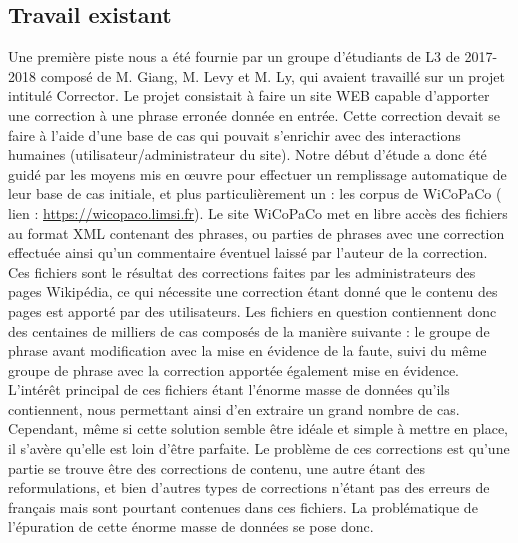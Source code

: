 \documentclass{article}
\begin{document}
\subsection{Travail existant}

Une premi\`{e}re piste nous a \'{e}t\'{e} fournie par un groupe d'\'{e}tudiants de L3 de 2017-2018 compos\'{e} de M. Giang, M. Levy et M. Ly, qui avaient travaill\'{e} sur un projet intitul\'{e} Corrector. Le projet consistait \`{a} faire un site WEB capable d'apporter une correction \`{a} une phrase erron\'{e}e donn\'{e}e en entr\'{e}e. Cette correction devait se faire \`{a} l'aide d'une base de cas qui pouvait s'enrichir avec des interactions humaines (utilisateur/administrateur du site). 
\newline
\newline
Notre d\'{e}but d'\'{e}tude a donc \'{e}t\'{e} guid\'{e} par les moyens mis en {\oe}uvre pour effectuer un remplissage automatique de leur base de cas initiale, et plus particuli\`{e}rement un : les corpus de WiCoPaCo (\cite{Wikipedia Correction and Paraphrase Corpus} lien : \url{https://wicopaco.limsi.fr}). Le site WiCoPaCo met en libre acc\`{e}s des fichiers au format XML contenant des phrases, ou parties de phrases avec une correction effectu\'{e}e ainsi qu'un commentaire \'{e}ventuel laiss\'{e} par l'auteur de la correction. Ces fichiers sont le r\'{e}sultat des corrections faites par les administrateurs des pages Wikip\'{e}dia, ce qui n\'{e}cessite une correction \'{e}tant donn\'{e} que le contenu des pages est apport\'{e} par des utilisateurs. Les fichiers en question contiennent donc des centaines de milliers de cas compos\'{e}s de la mani\`{e}re suivante : le groupe de phrase avant modification avec la mise en \'{e}vidence de la faute, suivi du m\^{e}me groupe de phrase avec la correction apport\'{e}e \'{e}galement mise en \'{e}vidence. 
\newline
\newline
L'int\'{e}r\^{e}t principal de ces fichiers \'{e}tant l'\'{e}norme masse de donn\'{e}es qu'ils contiennent, nous permettant ainsi d'en extraire un grand nombre de cas. Cependant, m\^{e}me si cette solution semble \^{e}tre id\'{e}ale et simple \`{a} mettre en place, il s'av\`{e}re qu'elle est loin d'\^{e}tre parfaite. Le probl\`{e}me de ces corrections est qu'une partie se trouve être des corrections de contenu, une autre \'{e}tant des reformulations, et bien d'autres types de corrections n'\'{e}tant pas des erreurs de fran\c{c}ais mais sont pourtant contenues dans ces fichiers. La probl\'{e}matique de l'\'{e}puration de cette \'{e}norme masse de donn\'{e}es se pose donc.
\end{document}
